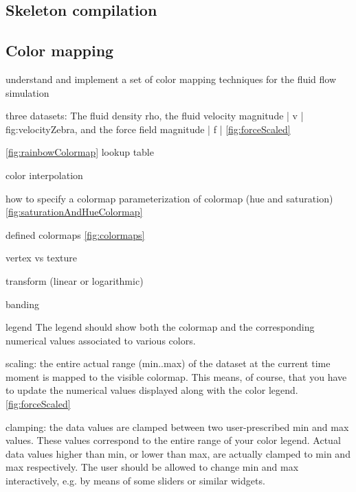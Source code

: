 \subsection{Skeleton compilation}
\subsection{Color mapping}


understand and implement a set of color mapping techniques for the fluid flow simulation

three datasets: The fluid density rho, the fluid velocity magnitude | v | fig:velocityZebra, and the force field magnitude | f | \ref{fig:forceScaled}

\ref{fig:rainbowColormap}
lookup table

color interpolation

how to specify a colormap
parameterization of colormap (hue and saturation) \ref{fig:saturationAndHueColormap}

defined colormaps \ref{fig:colormaps}
 
vertex vs texture

transform (linear or logarithmic)

banding 

legend  The legend should show both the colormap and the corresponding numerical values associated to various colors.

scaling: the entire actual range (min..max) of the dataset at the current time moment is mapped to the visible colormap. This means, of course, that you have to update the numerical values displayed along with the color legend.
\ref{fig:forceScaled}

clamping: the data values are clamped between two user-prescribed min and max values. These values correspond to the entire range of your color legend. Actual data values higher than min, or lower than max, are actually clamped to min and max respectively. The user should be allowed to change min and max interactively, e.g. by means of some sliders or similar widgets.
 

